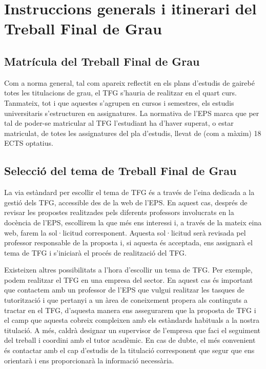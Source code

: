 
\chapter{Instruccions generals i itinerari del Treball Final de Grau }\label{instruccions}

\section{Matrícula del Treball Final de Grau}

Com a norma general, tal com apareix reflectit en els plans d'estudis de gairebé totes les titulacions de grau, el \ac{TFG} s'hauria de realitzar en el quart curs. Tanmateix, tot i que aquestes s'agrupen en cursos i semestres, els estudis universitaris s'estructuren en assignatures. La normativa de l'\acf{EPS} marca que per tal de poder-se matricular al \ac{TFG} l'estudiant ha d'haver superat, o estar matriculat, de totes les assignatures del pla d'estudis, llevat de (com a màxim) 18 ECTS optatius.

\section{Selecció del tema de Treball Final de Grau}

La via estàndard per escollir el tema de \ac{TFG} és a través de l'eina dedicada a la gestió dels \ac{TFG}, accessible des de la web  de l'\ac{EPS}. En aquest cas, després de revisar les propostes realitzades pels diferents professors involucrats en la docència de l'\ac{EPS}, escollirem la que més ens interessi i, a través de la mateix eina web, farem la sol·licitud corresponent. Aquesta sol·licitud serà revisada pel professor responsable de la proposta i, si aquesta és acceptada, ens assignarà el tema de \ac{TFG} i s'iniciarà el procés de realització del TFG.

Existeixen altres possibilitats a l'hora d'escollir un tema de \ac{TFG}. Per exemple, podem realitzar el \ac{TFG} en una empresa del sector. En aquest cas és important que contactem amb un professor de l'\ac{EPS} que vulgui realitzar les tasques de tutorització i que pertanyi a un àrea de coneixement propera als continguts a tractar en el \ac{TFG}, d'aquesta manera ens assegurarem que la proposta de \ac{TFG} i el camp que aquesta cobreix compleixen amb els estàndards habituals a la nostra titulació. A més, caldrà designar un supervisor de l'empresa que faci el seguiment del treball i coordini amb el tutor acadèmic. En cas de dubte, el més convenient és contactar amb el cap d'estudis de la titulació corresponent que segur que ens orientarà i ens proporcionarà la informació necessària.

